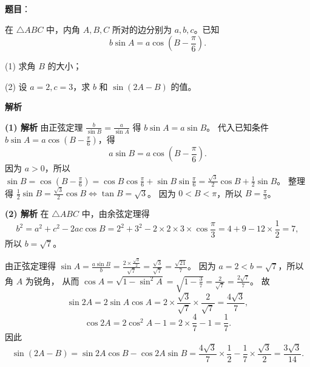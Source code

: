 \begin{answer}

\textbf{题目}：

在 $\triangle ABC$ 中，内角 $A,B,C$ 所对的边分别为 $a,b,c$。已知
\nopagebreak[4]
\[
b\sin A=a\cos\left(B-\frac\pi6\right).
\]

(1) 求角 $B$ 的大小；

(2) 设 $a=2,c=3$，求 $b$ 和 $\sin(2A-B)$ 的值。

\textbf{解析}

\textbf{(1) 解析} 由正弦定理 $\frac{b}{\sin B}=\frac{a}{\sin A}$ 得 $b\sin A=a\sin B$。
代入已知条件 $b\sin A=a\cos\left(B-\frac\pi6\right)$，得
\nopagebreak[4]
\[a\sin B=a\cos\left(B-\frac\pi6\right).\]
因为 $a>0$，所以 $\sin B=\cos\left(B-\frac\pi6\right)=\cos B\cos\frac\pi6+\sin B\sin\frac\pi6=\frac{\sqrt3}{2}\cos B+\frac12\sin B$。
整理得 $\frac12\sin B=\frac{\sqrt3}{2}\cos B\iff\tan B=\sqrt3$。
因为 $0<B<\pi$，所以 $B=\frac\pi3$。

\textbf{(2) 解析} 在 $\triangle ABC$ 中，由余弦定理得
\nopagebreak[4]
\[b^2=a^2+c^2-2ac\cos B=2^2+3^2-2\times 2\times 3\times\cos\frac\pi3=4+9-12\times\frac12=7,\]
所以 $b=\sqrt7$。

由正弦定理得 $\sin A=\frac{a\sin B}{b}=\frac{2\times\frac{\sqrt3}{2}}{\sqrt7}=\frac{\sqrt3}{\sqrt7}=\frac{\sqrt{21}}{7}$。
因为 $a=2<b=\sqrt7$，所以角 $A$ 为锐角，
从而 $\cos A=\sqrt{1-\sin^2 A}=\sqrt{1-\frac{3}{7}}=\frac{2}{\sqrt7}=\frac{2\sqrt7}{7}$。
故
\nopagebreak[4]
\[\sin 2A=2\sin A\cos A=2\times\frac{\sqrt3}{\sqrt7}\times\frac{2}{\sqrt7}=\frac{4\sqrt3}{7},\]
\nopagebreak[4]
\[\cos 2A=2\cos^2 A-1=2\times\frac{4}{7}-1=\frac17.\]
因此
\nopagebreak[4]
\[\sin(2A-B)=\sin 2A\cos B-\cos 2A\sin B=\frac{4\sqrt3}{7}\times\frac12-\frac17\times\frac{\sqrt3}{2}=\frac{3\sqrt3}{14}.\]



\end{answer}
